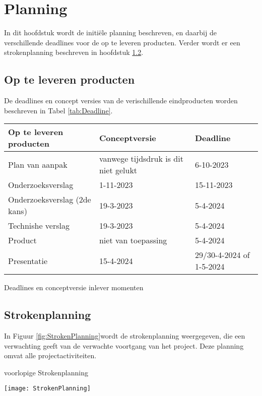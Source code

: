\chapter{Planning}
In dit hoofdstuk wordt de initiële planning beschreven, en daarbij de verschillende deadlines voor de op te leveren producten.
Verder wordt er een strokenplanning beschreven in hoofdstuk \ref{sec:strokenplanning}.
\section{Op te leveren producten}
De deadlines en concept versies van de verischillende eindproducten worden beschreven in Tabel \ref{tab:Deadline}.
\begin{graphic}
	\captionsetup{type=table}
	\begin{tabularx}{\textwidth}{|l|l|X|}
		\hline
		\textbf{Op te leveren producten} & \textbf{Conceptversie}               & \textbf{Deadline}         \\
		\hline
		Plan van aanpak                  & vanwege tijdsdruk is dit niet gelukt & 6-10-2023                 \\
		\hline
		Onderzoeksverslag                & 1-11-2023                            & 15-11-2023                \\
		\hline
		Onderzoeksverslag (2de kans)     & 19-3-2023                            & 5-4-2024                  \\
		\hline
		Technishe verslag                & 19-3-2023                            & 5-4-2024                  \\
		\hline
		Product                          & niet van toepassing                  & 5-4-2024                  \\
		\hline
		Presentatie                      & 15-4-2024                            & 29/30-4-2024 of 1-5-2024 \\
		\hline
	\end{tabularx}
	\caption{Deadlines en conceptversie inlever momenten}
	\label{tab:Deadline}
\end{graphic}
\section{Strokenplanning}
\label{sec:strokenplanning}
In Figuur \ref{fig:StrokenPlanning}wordt de strokenplanning weergegeven, die een verwachting geeft van de verwachte voortgang van het project.
Deze planning omvat alle projectactiviteiten.
\begin{graphic}
	\captionsetup{type=figure}
	\caption{voorlopige Strokenplanning}
	\texttt{[image: StrokenPlanning]}
	\label{fig:StrokenPlanning}
\end{graphic}
